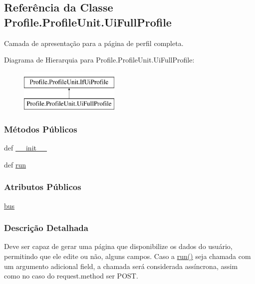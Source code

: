 \hypertarget{classProfile_1_1ProfileUnit_1_1UiFullProfile}{\subsection{Referência da Classe Profile.\-Profile\-Unit.\-Ui\-Full\-Profile}
\label{classProfile_1_1ProfileUnit_1_1UiFullProfile}
}


Camada de apresentação para a página de perfil completa.  


Diagrama de Hierarquia para Profile.\-Profile\-Unit.\-Ui\-Full\-Profile\-:\begin{figure}[H]
\begin{center}
\leavevmode
\includegraphics[height=2.000000cm]{db/d57/classProfile_1_1ProfileUnit_1_1UiFullProfile}
\end{center}
\end{figure}
\subsubsection*{Métodos Públicos}
\begin{DoxyCompactItemize}
\item 
def \hyperlink{classProfile_1_1ProfileUnit_1_1UiFullProfile_ae9ec0c6554ceb52fd45d48dda2ea4218}{\-\_\-\-\_\-init\-\_\-\-\_\-}
\item 
def \hyperlink{classProfile_1_1ProfileUnit_1_1UiFullProfile_a7a7747246b627020a345f7a3eac27778}{run}
\end{DoxyCompactItemize}
\subsubsection*{Atributos Públicos}
\begin{DoxyCompactItemize}
\item 
\hyperlink{classProfile_1_1ProfileUnit_1_1UiFullProfile_a47049f3f61c7fada93dd84fccd19a2bd}{bus}
\end{DoxyCompactItemize}


\subsubsection{Descrição Detalhada}
Deve ser capaz de gerar uma página que disponibilize os dados do usuário, permitindo que ele edite ou não, alguns campos. Caso a \hyperlink{classProfile_1_1ProfileUnit_1_1UiFullProfile_a7a7747246b627020a345f7a3eac27778}{run()} seja chamada com um argumento adicional field, a chamada será considerada assíncrona, assim como no caso do request.\-method ser P\-O\-S\-T. 

